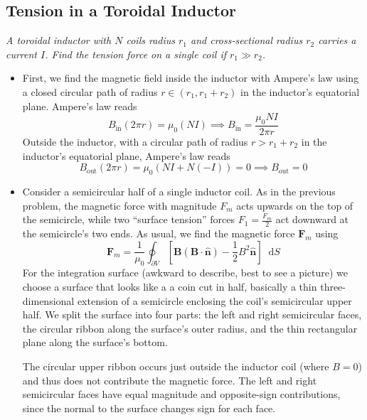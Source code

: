 \documentclass[11pt, a4paper]{article}
\newcommand{\diff}{\mathop{}\!\mathrm{d}} %
\renewcommand{\vec}[1]{\bm{#1}} %
\newcommand{\uvec}[1]{\hat{\vec{#1}}} %
\newcommand{\B}{\vec{B}}  %
\begin{document}
\subsection{Tension in a Toroidal Inductor}
\textit{A toroidal inductor with $ N $ coils radius $ r_{1} $ and cross-sectional radius $ r_{2} $ carries a current $ I $. Find the tension force on a single coil if $ r_{1} \gg r_{2} $.}
\begin{itemize}
	\item First, we find the magnetic field inside the inductor with Ampere's law using a closed circular path of radius $ r \in (r_{1}, r_{1} + r_{2}) $ in the inductor's equatorial plane. Ampere's law reads
	\begin{equation*}
		B_{\text{in}} (2\pi r) = \mu_{0} (NI) \implies B_{\text{in}} = \frac{\mu_{0}NI}{2\pi r}
	\end{equation*}
	Outside the inductor, with a circular path of radius $ r > r_{1} + r_{2} $ in the inductor's equatorial plane, Ampere's law reads
	\begin{equation*}
		B_{\text{out}} (2\pi r) = \mu_{0} (NI + N(-I)) = 0 \implies B_{\text{out}} = 0
	\end{equation*}
	
	\item Consider a semicircular half of a single inductor coil. As in the previous problem, the magnetic force with magnitude $ F_{m} $ acts upwards on the top of the semicircle, while two ``surface tension'' forces $ F_{1} = \frac{F_{m}}{2} $ act downward at the semicircle's two ends. As usual, we find the magnetic force $ \vec{F}_{m} $ using
	\begin{equation*}
		\vec{F}_{m} = \frac{1}{\mu_{0}}\oint_{\partial V}\left [\B(\B \cdot \uvec{n}) - \frac{1}{2}B^{2}\uvec{n}\right ] \diff S
	\end{equation*}
	For the integration surface (awkward to describe, best to see a picture) we choose a surface that looks like a a coin cut in half, basically a thin three-dimensional extension of a semicircle enclosing the coil's semicircular upper half. We split the surface into four parts: the left and right semicircular faces, the circular ribbon along the surface's outer radius, and the thin rectangular plane along the surface's bottom. 
	
	The circular upper ribbon occurs just outside the inductor coil (where $ B = 0 $) and thus does not contribute the magnetic force. The left and right semicircular faces have equal magnitude and opposite-sign contributions, since the normal to the surface changes sign for each face. 
	

\end{itemize}
\end{document}
